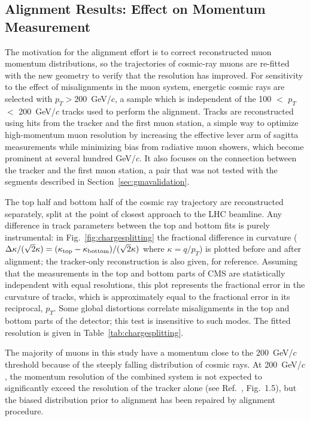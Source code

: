 \subsection{Alignment Results: Effect on Momentum Measurement}
\label{sec:momentum}

The motivation for the alignment effort is to correct reconstructed
muon momentum distributions, so the trajectories of
cosmic-ray muons are re-fitted with the new geometry to verify that the resolution
has improved.  For sensitivity to the effect of misalignments in the muon
system, energetic cosmic rays are selected with $p_T > 200$~GeV/$c$, a
sample which is independent of the 100 $<$ $p_T$ $<$ 200~GeV/$c$
tracks used to perform the alignment.  Tracks are reconstructed using
hits from the tracker and the first muon station, a simple way to
optimize high-momentum muon resolution by increasing the effective
lever arm of sagitta measurements while minimizing bias from radiative
muon showers, which become prominent at several hundred GeV/$c$.  It
also focuses on the connection between the tracker and the first muon
station, a pair that was not tested with the segments described
in Section~\ref{sec:gmavalidation}.

The top half and bottom half of the cosmic ray trajectory are
reconstructed separately, split at the point of closest approach to
the LHC beamline.  Any difference in track parameters between the top
and bottom fits is purely instrumental: in
Fig.~\ref{fig:chargesplitting} the fractional difference in
curvature ($\Delta \kappa/(\sqrt{2}\kappa) =
(\kappa_{\mbox{\scriptsize top}} - \kappa_{\mbox{\scriptsize
bottom}})/(\sqrt{2}\kappa)$ where $\kappa = q/p_T$) is plotted before and after
alignment; the tracker-only reconstruction is also given, for
reference.  Assuming that the measurements in the top and bottom parts
of CMS are statistically independent with equal
resolutions, this plot represents the fractional error in the
curvature of tracks, which is approximately equal to the fractional
error in its reciprocal, $p_T$.  Some global distortions correlate
misalignments in the top and bottom parts of the detector; this test is
insensitive to such modes.  The fitted resolution is given in
Table~\ref{tab:chargesplitting}.

The majority of muons in this study
have a momentum close to the 200~GeV/$c$ threshold because of the
steeply falling distribution of cosmic rays.  At 200~GeV/$c$, the
momentum resolution of the combined system is not expected to
significantly exceed the resolution of the tracker alone (see
Ref.~\cite{Ball:2007zza}, Fig.~1.5), but the biased distribution prior
to alignment has been repaired by alignment procedure.

